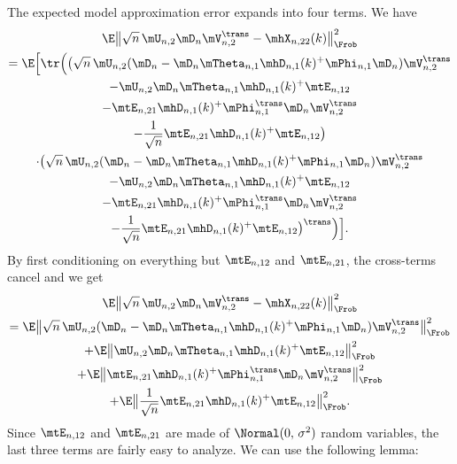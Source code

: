 The expected model approximation error expands into four terms.  We have
\begin{multline*}
	\E \big\|
		\sqrt{n} \, \mU_{n,2} \mD_n \mV_{n,2}^\trans
		-
		\mhX_{n,22}(k)
	\big\|_\Frob^2 \\
		=
			\E\Big[ 
				\tr \Big(
					\big(
						\sqrt{n} \,
						\mU_{n,2} 
						( 
							\mD_n 
							- 
							\mD_n 
							\mTheta_{n,1} \mhD_{n,1}(k)^+ \mPhi_{n,1}
							\mD_n
						)
						\mV_{n,2}^\trans \\
						-
						\mU_{n,2} 
						\mD_n \mTheta_{n,1} \mhD_{n,1}(k)^+ 
						\mtE_{n,12} \\
						- 
						\mtE_{n,21}
						\mhD_{n,1}(k)^+ \mPhi_{n,1}^\trans \mD_n 
						\mV_{n,2}^\trans \\
						-
						\frac{1}{\sqrt{n}}
						\mtE_{n,21}
						\mhD_{n,1}(k)^+
						\mtE_{n,12}
					\big) \\
					\cdot
					\big(
						\sqrt{n} \,
						\mU_{n,2} 
						( 
							\mD_n 
							- 
							\mD_n 
							\mTheta_{n,1} \mhD_{n,1}(k)^+ \mPhi_{n,1}
							\mD_n
						)
						\mV_{n,2}^\trans \\
						-
						\mU_{n,2} 
						\mD_n \mTheta_{n,1} \mhD_{n,1}(k)^+ 
						\mtE_{n,12} \\
						- 
						\mtE_{n,21}
						\mhD_{n,1}(k)^+ \mPhi_{n,1}^\trans \mD_n 
						\mV_{n,2}^\trans \\
						-
						\frac{1}{\sqrt{n}}
						\mtE_{n,21}
						\mhD_{n,1}(k)^+
						\mtE_{n,12}
					\big)^\trans
				\Big)
			\Big].
\end{multline*}
By first conditioning on everything but $\mtE_{n,12}$ and $\mtE_{n,21}$, the
cross-terms cancel and we get
\begin{multline*}
	\E \big\|
		\sqrt{n} \, \mU_{n,2} \mD_n \mV_{n,2}^\trans
		-
		\mhX_{n,22}(k)
	\big\|_\Frob^2 \\
		=
			\E\big\|
				\sqrt{n} \,
				\mU_{n,2} 
				( 
					\mD_n 
					- 
					\mD_n 
					\mTheta_{n,1} \mhD_{n,1}(k)^+ \mPhi_{n,1}
					\mD_n
				)
				\mV_{n,2}^\trans 
			\big\|_\Frob^2 \\
			+
			\E\big\|
				\mU_{n,2} 
				\mD_n \mTheta_{n,1} \mhD_{n,1}(k)^+ 
				\mtE_{n,12}
			\big\|_\Frob^2 \\
			+
			\E\big\|
				\mtE_{n,21}
				\mhD_{n,1}(k)^+ \mPhi_{n,1}^\trans \mD_n 
				\mV_{n,2}^\trans
			\big\|_\Frob^2 \\
			+
			\E\big\|
				\frac{1}{\sqrt{n}}
				\mtE_{n,21}
				\mhD_{n,1}(k)^+
				\mtE_{n,12}
			\big\|_\Frob^2.
\end{multline*}
Since $\mtE_{n,12}$ and $\mtE_{n,21}$ are made of \iid $\Normal( 0, \, \sigma^2)$ random variables, the last three terms are fairly easy to analyze.
We can use the following lemma:

